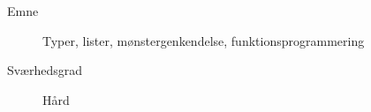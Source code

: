 \begin{description}
\item[Emne] Typer, lister, mønstergenkendelse, funktionsprogrammering
\item[Sværhedsgrad] Hård
\end{description}
